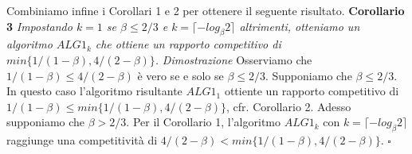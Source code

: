 \documentclass[12pt]{article}
\begin{document}
Combiniamo infine i Corollari 1 e 2 per ottenere il seguente risultato.\newline\newline
\textbf{Corollario 3}
\textit{Impostando $k = 1$ se $\beta  \leq 2/3$ e $k = \lceil- log_{\beta}2\rceil$ altrimenti, otteniamo un algoritmo $ALG1_{k}$ che ottiene un rapporto competitivo di $min\{1 / (1 - \beta ), 4 / (2 - \beta )\}$.}\newline\newline
\textit{Dimostrazione}
Osserviamo che $1 / (1 - \beta ) \leq 4 / (2 - \beta )$ è vero se e solo se $\beta  \leq 2/3$. Supponiamo che $\beta  \leq 2/3$. In questo caso l'algoritmo risultante $ALG1_{1}$ ottiente un rapporto competitivo di $1 / (1 - \beta ) \leq min \{1 / (1 - \beta ), 4 / (2 - \beta )\}$, cfr. Corollario 2. Adesso supponiamo che $\beta > 2/3$. Per il Corollario 1, l'algoritmo $ALG1_{k}$ con  $k = \lceil- log_{\beta}2\rceil$ raggiunge una competitività di $4 / (2 - \beta ) <min \{1 / (1 - \beta ), 4 / (2 - \beta )\}$. \hfill $\square$ 
\end{document}
